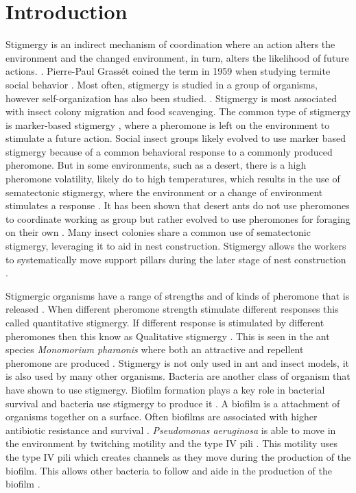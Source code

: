 \section{Introduction}

Stigmergy is an indirect mechanism of coordination where an action alters the environment and the changed environment, in turn, alters the likelihood of future actions. \cite{susi_social_2001, ahadeli_multi-agent_2004}.
Pierre-Paul Grassét coined the term in 1959 when studying termite social behavior \cite{heylighen_stigmergy_2016a}.
Most often, stigmergy is studied in a group of organisms, however self-organization has also been studied.  \cite{heylighen_stigmergy_2016b}.
Stigmergy is most associated with  insect colony migration and food scavenging.
The common type of stigmergy is marker-based stigmergy \cite{ahadeli_multi-agent_2004, heylighen_stigmergy_2016b}, where a pheromone is left on the environment to stimulate a future  action.
Social insect groups likely evolved to use marker based stigmergy because of a common behavioral response to a commonly produced pheromone.
But in some environments, such as a desert, there is a high pheromone volatility, likely do to high temperatures, which results in the use of sematectonic stigmergy, where the environment or a change of environment stimulates a response \cite{ahadeli_multi-agent_2004, heylighen_stigmergy_2016a}. It has been shown that desert ants do not use pheromones to coordinate working as group but rather evolved to use pheromones for foraging on their own \cite{ruano_high_2000}.
Many insect colonies share a common use of sematectonic stigmergy, leveraging it to aid in nest construction. Stigmergy allows the workers to systematically move support pillars during the later stage of nest construction \cite{dorigo_ant_2000,khuong_stigmergic_2016}.

Stigmergic organisms have a range of strengths and of kinds of pheromone that is released \cite{theraulaz1999brief}.
When different pheromone  strength stimulate different responses  this called quantitative stigmergy. If different  response is stimulated by different pheromones then this know as  Qualitative stigmergy \cite{heylighen_stigmergy_2016b}.
This is seen in the ant species \textit{Monomorium pharaonis} where both an attractive and repellent pheromone are produced  \cite{jeanson_pced heromone_2003}.
Stigmergy is not only used in ant and insect models, it is also used by many other organisms.
Bacteria are another class of organism that have shown to use stigmergy.
Biofilm formation plays a key role in bacterial survival and bacteria use stigmergy to produce it \cite{gloag_bacterial_2015}.
A biofilm is a attachment of organisms together on a surface.
Often biofilms are associated with higher antibiotic resistance and survival \cite{donlan2002biofilms}.
\textit{Pseudomonas aeruginosa} is able to move in the environment by twitching motility and the type IV pili \cite{persat2015type}.
This motility uses the type IV pili which creates channels as they move during the production of the biofilm.
This allows other bacteria to follow and aide in the production of the biofilm \cite{gloag_stigmergy:_2013}.

